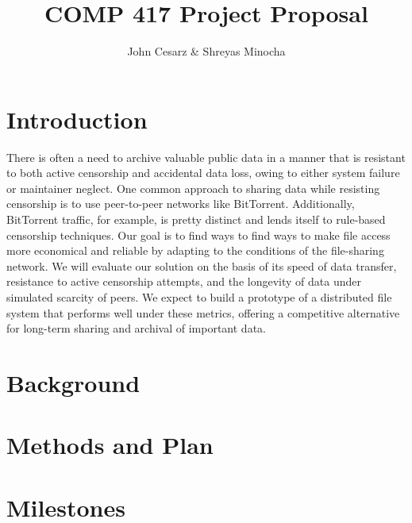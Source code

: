 \documentclass{article}
\title{COMP 417 Project Proposal}
\author{John Cesarz \& Shreyas Minocha}
\begin{document}
\maketitle

\section{Introduction}

There is often a need to archive valuable public data in a manner that is resistant to both active censorship and accidental data loss, owing to either system failure or maintainer neglect.
%
One common approach to sharing data while resisting censorship is to use peer-to-peer networks like BitTorrent.
Additionally, BitTorrent traffic, for example, is pretty distinct and lends itself to rule-based censorship techniques.
%
Our goal is to find ways to find ways to make file access more economical and reliable by adapting to the conditions of the file-sharing network.
%
%
%
We will evaluate our solution on the basis of its speed of data transfer, resistance to active censorship attempts, and the longevity of data under simulated scarcity of peers.
%
We expect to build a prototype of a distributed file system that performs well under these metrics, offering a competitive alternative for long-term sharing and archival of important data.

\section{Background}


\lipsum[2]

\section{Methods and Plan}



\lipsum[3]

\section{Milestones}


\lipsum[4]
\end{document}
